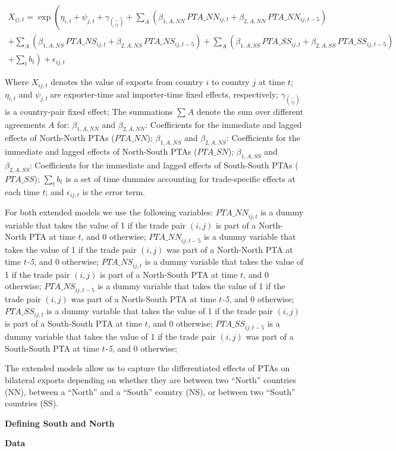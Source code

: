 \begin{multline}
    X_{ij,t} = \exp\left(\eta_{i,t} + \psi_{j,t} + \gamma_{\binom{-}{ij}} + \sum_{A}\left(\beta_{1,A,NN} \, PTA\_NN_{ij,t} + \beta_{2,A,NN} \, PTA\_NN_{ij,t-5}\right) \right. \\
    + \sum_{A}\left(\beta_{1,A,NS} \, PTA\_NS_{ij,t} + \beta_{2,A,NS} \, PTA\_NS_{ij,t-5}\right) + \sum_{A}\left(\beta_{1,A,SS} \, PTA\_SS_{ij,t} + \beta_{2,A,SS} \, PTA\_SS_{ij,t-5}\right) \\
    + \left. \sum_{t} b_{t} \right) + \epsilon_{ij,t}
\end{multline}

Where \(X_{ij,t}\)\hspace{0pt} denotes the value of exports from country
\(i\) to country \(j\) at time \(t\); \(\eta_{i,t}\) and
\(\psi_{j,t}\ \)are exporter-time and importer-time fixed effects,
respectively; \(\gamma_{\binom{-}{ij}}\) is a country-pair fixed effect;
The summations \hspace{0pt}\(\sum_{}^{}A\) denote the sum over different
agreements \(A\) for: \(\beta_{1,A,NN}\) and \(\beta_{2,A,NN}\):
Coefficients for the immediate and lagged effects of North-North PTAs
\hspace{0pt}(\(PTA\_ NN\)); \(\beta_{1,A,NS}\) and \(\beta_{2,A,NS}\):
Coefficients for the immediate and lagged effects of North-South PTAs
(\(PTA\_ SN\)); \(\beta_{1,A,SS}\) and \(\beta_{2,A,SS}\): Coefficients
for the immediate and lagged effects of South-South PTAs (\(PTA\_ SS\));
\(\sum_{t}^{}b_{t}\) is a set of time dummies accounting for
trade-specific effects at each time \(t\); and \(\epsilon_{ij,t}\) is
the error term.

For both extended models we use the following variables:
\({PTA\_ NN}_{ij,t}\) is a dummy variable that takes the value of 1 if
the trade pair \((i,j)\) is part of a North-North PTA at time \(t\), and
0 otherwise; \({PTA\_ NN}_{ij,t - 5}\) is a dummy variable that takes
the value of 1 if the trade pair \((i,j)\) was part of a North-North PTA
at time \(t\)\emph{-5}, and 0 otherwise; \({PTA\_ NS}_{ij,t}\) is a
dummy variable that takes the value of 1 if the trade pair \((i,j)\) is
part of a North-South PTA at time \(t\), and 0 otherwise;
\({PTA\_ NS}_{ij,t - 5}\) is a dummy variable that takes the value of 1
if the trade pair \((i,j)\) was part of a North-South PTA at time
\(t\)\emph{-5}, and 0 otherwise; \({PTA\_ SS}_{ij,t}\) is a dummy
variable that takes the value of 1 if the trade pair \((i,j)\) is part
of a South-South PTA at time \(t\), and 0 otherwise;
\({PTA\_ SS}_{ij,t - 5}\) is a dummy variable that takes the value of 1
if the trade pair \((i,j)\) was part of a South-South PTA at time
\(t\)\emph{-5}, and 0 otherwise;

The extended models allow us to capture the differentiated effects of
PTAs on bilateral exports depending on whether they are between two
``North'' countries (NN), between a ``North'' and a ``South'' country
(NS), or between two ``South'' countries (SS).

\textbf{Defining South and North}

\textbf{Data}